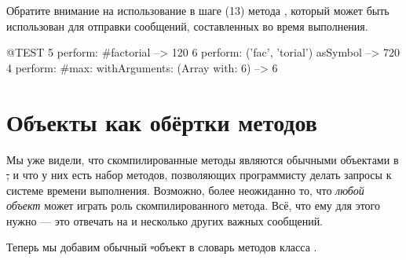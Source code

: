 \documentclass[a4paper,10pt,twoside]{book}
\begin{document}
{%
Обратите внимание на использование в шаге (13) метода , который может быть использован для отправки сообщений, составленных во время выполнения.
\begin{code}{@TEST}
5 perform: #factorial                                             --> 120
6 perform: ('fac', 'torial') asSymbol                       --> 720
4 perform: #max: withArguments: (Array with: 6) --> 6
\end{code}

\section{Объекты как обёртки методов}

Мы уже видели, что скомпилированные методы являются обычными объектами в \st, и что у них есть набор методов, позволяющих программисту делать запросы к системе времени выполнения.
Возможно, более неожиданно то, что \emph{любой объект} может играть роль скомпилированного метода. Всё, что ему для этого нужно --- это отвечать на  и несколько других важных сообщений.


Теперь мы добавим обычный \st-объект в словарь методов класса  .

\dothis{Выполните \lct{Demo methodDict at: \#answer42 put: ObjectsAsMethodsExample new.}
Теперь попробуйте напечатать результат выражения \ct{Demo new answer42}. На этот раз ответ будет --- \ct{42}.}

}
\end{document}
